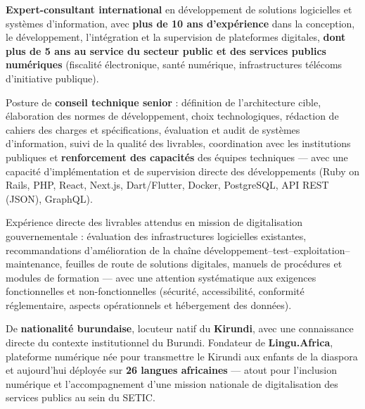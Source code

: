 
\begin{cvparagraph}
\textbf{Expert-consultant international} en développement de solutions logicielles et systèmes d'information, avec \textbf{plus de 10 ans d'expérience} dans la conception, le développement, l'intégration et la supervision de plateformes digitales, \textbf{dont plus de 5 ans au service du secteur public et des services publics numériques} (fiscalité électronique, santé numérique, infrastructures télécoms d'initiative publique).

Posture de \textbf{conseil technique senior} : définition de l'architecture cible, élaboration des normes de développement, choix technologiques, rédaction de cahiers des charges et spécifications, évaluation et audit de systèmes d'information, suivi de la qualité des livrables, coordination avec les institutions publiques et \textbf{renforcement des capacités} des équipes techniques — avec une capacité d'implémentation et de supervision directe des développements (Ruby on Rails, PHP, React, Next.js, Dart/Flutter, Docker, PostgreSQL, API REST (JSON), GraphQL).

Expérience directe des livrables attendus en mission de digitalisation gouvernementale : évaluation des infrastructures logicielles existantes, recommandations d'amélioration de la chaîne développement–test–exploitation–maintenance, feuilles de route de solutions digitales, manuels de procédures et modules de formation — avec une attention systématique aux exigences fonctionnelles et non-fonctionnelles (sécurité, accessibilité, conformité réglementaire, aspects opérationnels et hébergement des données).

De \textbf{nationalité burundaise}, locuteur natif du \textbf{Kirundi}, avec une connaissance directe du contexte institutionnel du Burundi. Fondateur de \textbf{Lingu.Africa}, plateforme numérique née pour transmettre le Kirundi aux enfants de la diaspora et aujourd'hui déployée sur \textbf{26 langues africaines} — atout pour l'inclusion numérique et l'accompagnement d'une mission nationale de digitalisation des services publics au sein du SETIC.
\end{cvparagraph}
